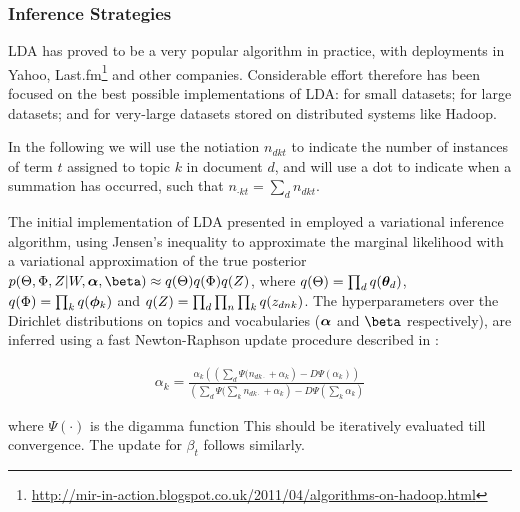 

\subsubsection{Inference Strategies}
LDA has proved to be a very popular algorithm in practice, with deployments in Yahoo\cite{Ahmed2011a}, Last.fm\footnote{\url{http://mir-in-action.blogspot.co.uk/2011/04/algorithms-on-hadoop.html}} and other companies. Considerable effort therefore has been focused on the best possible implementations of LDA: for small datasets; for large datasets; and for very-large datasets stored on distributed systems like Hadoop.

In the following we will use the notiation $n_{dkt}$ to indicate the number of instances of term $t$ assigned to topic $k$ in document $d$, and will use a dot to indicate when a summation has occurred, such that $n_{\cdot k t} = \sum_d n_{dkt}$.



The initial implementation of LDA presented in \cite{BleiNgJordan2003} employed a variational inference algorithm\cite{Bernardo2003}, using Jensen's inequality to approximate the marginal likelihood with a variational approximation of the true posterior $p(\Theta,\Phi,Z|W,\vv{\alpha},\vv{\beta}) \approx q(\Theta)q(\Phi)q(Z) $, where $q(\Theta) = \prod_d q({ \bm \theta_d })$, $q(\Phi) = \prod_k q({ \bm \phi_k })$ and $q(Z) = \prod_d \prod_n \prod_k q({ z_{dnk} })$. The hyperparameters over the Dirichlet distributions on topics and vocabularies ($\bm \alpha$ and $\vv{\beta}$ respectively), are inferred using a fast Newton-Raphson update procedure described in \cite{Minka2000}:

\begin{align}
\alpha_k = \frac{\alpha_k \left( \left(\sum_d \Psi(n_{dk\cdot} + \alpha_k \right) - D \Psi (\alpha_k)\right)}{\left(\sum_d  \Psi(\sum_k n_{dk\cdot} + \alpha_k \right) - D \Psi (\sum_k \alpha_k)}
\end{align}

where $\Psi(\cdot)$ is the digamma function This should be iteratively evaluated till convergence. The update for $\beta_t$ follows similarly.


